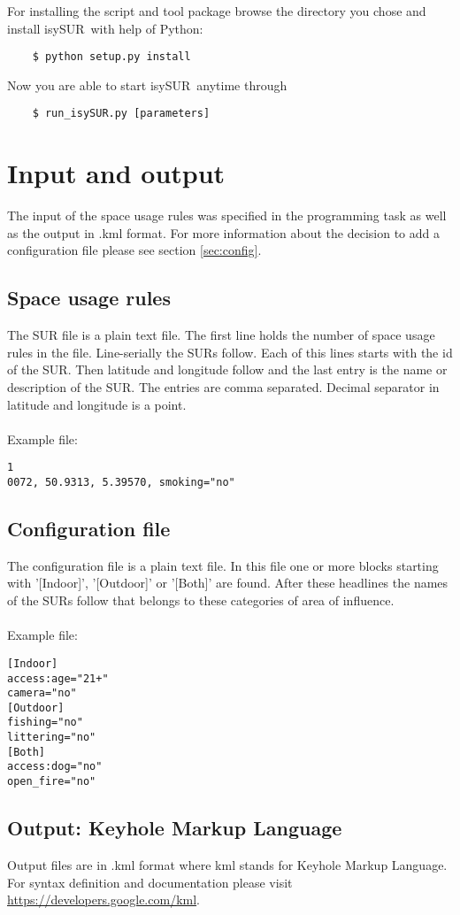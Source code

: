 \documentclass[11pt,fleqn]{book} %
\newcommand{\ProjectTitle}{isySUR}
\newcommand{\pt}{\ProjectTitle}
\begin{document}
For installing the script and tool package browse the directory you chose and install \pt\ with help of Python:
\begin{verbatim}
	$ python setup.py install
\end{verbatim}
Now you are able to start \pt\ anytime through
\begin{verbatim}
	$ run_isySUR.py [parameters]
\end{verbatim}

\section{Input and output}\label{sec:io}
The input of the space usage rules was specified in the programming task as well as the output in .kml format. For more information about the decision to add a configuration file please see section \ref{sec:config}.

\subsection{Space usage rules}
The SUR file is a plain text file. The first line holds the number of space usage rules in the file. Line-serially the SURs follow. Each of this lines starts with the id of the SUR. Then latitude and longitude follow and the last entry is the name or description of the SUR. The entries are comma separated. Decimal separator in latitude and longitude is a point.
\\~\\
Example file:
\begin{verbatim}
1
0072, 50.9313, 5.39570, smoking="no"
\end{verbatim}

\subsection{Configuration file}
The configuration file is a plain text file. In this file one or more blocks starting with '[Indoor]', '[Outdoor]' or '[Both]' are found. After these headlines the names of the SURs follow that belongs to these categories of area of influence.
\\~\\
Example file:
\begin{verbatim}
[Indoor]
access:age="21+"
camera="no"
[Outdoor]
fishing="no"
littering="no"
[Both]
access:dog="no"
open_fire="no"
\end{verbatim}

\subsection{Output: Keyhole Markup Language}
Output files are in .kml format where kml stands for Keyhole Markup Language. For syntax definition and documentation please visit \url{https://developers.google.com/kml}.
\end{document}

